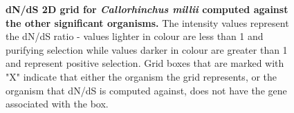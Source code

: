 \documentclass{article}
\begin{document}
\begin{figure}[H]
\centering
{}
\caption{\textbf{dN/dS 2D grid for \textit{Callorhinchus millii} computed against the other significant organisms.} The intensity values represent the dN/dS ratio - values lighter in colour are less than 1 and purifying selection while values darker in colour are greater than 1 and represent positive selection. Grid boxes that are marked with "X" indicate that either the organism the grid represents, or the organism that dN/dS is computed against, does not have the gene associated with the box.}
\label{sup_fig_19}
\end{figure}
\end{document}
